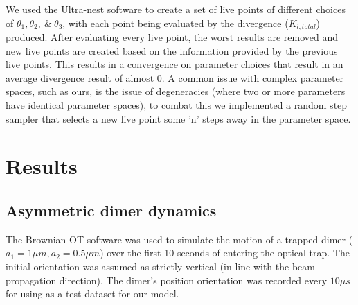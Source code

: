 \documentclass[review,3p]{elsarticle}
\begin{document}
We used the Ultra-nest software to create a set of live points of different choices of $\theta_1, \theta_2, \ \& \ \theta_3$, with each point being evaluated by the divergence ($K_{l, total}$) produced. After evaluating every live point, the worst results are removed and new live points are created based on the information provided by the previous live points. This results in a convergence on parameter choices that result in an average divergence result of almost 0. A common issue with complex parameter spaces, such as ours, is the issue of degeneracies (where two or more parameters have identical parameter spaces), to combat this we implemented a random step sampler that selects a new live point some 'n' steps away in the parameter space.
 
\section{Results}
\label{3}
\subsection{Asymmetric dimer dynamics}
\label{3.1}
The Brownian OT software was used to simulate the motion of a trapped dimer ($a_1=1\mu m, a_2=0.5\mu m$) over the first 10 seconds of entering the optical trap. The initial orientation was assumed as strictly vertical (in line with the beam propagation direction). The dimer's position orientation was recorded every $10 \mu s$ for using as a test dataset for our model. 
\end{document}
